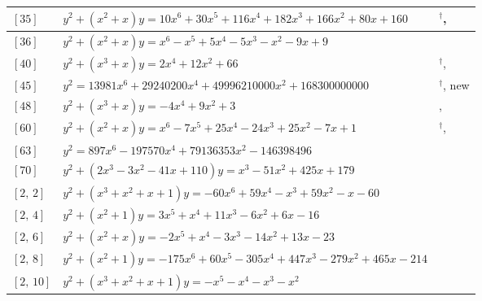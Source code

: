 \documentclass[11pt]{amsart}
\begin{document}
\begin{longtable}{|>{\raggedright\arraybackslash}p{1.7cm}|>{\raggedright\arraybackslash}p{}|>{\raggedright\arraybackslash}p{2.6cm}|}
$[35]$ & \href{https://alpha.lmfdb.org/Genus2Curve/Q/?jump=[[160,80,166,182,116,30,10],[0,1,1]]}{$y^2 + (x^{2}+x)y = 10x^{6}+30x^{5}+116x^{4}+182x^{3}+166x^{2}+80x+160$} & \cite{HLP2000}$^\dagger$, \cite{BookerSutherland}\\ \hline
$[36]$ & \href{https://alpha.lmfdb.org/Genus2Curve/Q/?jump=[[9,-9,-1,-5,5,-1,1],[0,1,1]]}{$y^2 + (x^{2}+x)y = x^{6}-x^{5}+5x^{4}-5x^{3}-x^{2}-9x+9$} & \cite{PP2012b,Platonov2014}\\ \hline
$[40]$ & \href{https://alpha.lmfdb.org/Genus2Curve/Q/?jump=[[66,0,12,0,2],[0,1,0,1]]}{$y^2 + (x^{3}+x)y = 2x^{4}+12x^{2}+66$} & \cite{HLP2000}$^\dagger$, \cite{BookerSutherland}\\ \hline
$[45]$ & $y^2 = 13981x^{6}+29240200x^{4}+49996210000x^{2}+168300000000$ & \cite{HLP2000}$^\dagger$, new\\ \hline
$[48]$ & \href{https://alpha.lmfdb.org/Genus2Curve/Q/?jump=[[3,0,9,0,-4],[0,1,0,1]]}{$y^2 + (x^{3}+x)y = -4x^{4}+9x^{2}+3$} & \cite{PP2012b,Platonov2014}, \cite{Howe2015}\\ \hline
$[60]$ & \href{https://alpha.lmfdb.org/Genus2Curve/Q/?jump=[[1,-7,25,-24,25,-7,1],[0,1,1]]}{$y^2 + (x^{2}+x)y = x^{6}-7x^{5}+25x^{4}-24x^{3}+25x^{2}-7x+1$} & \cite{HLP2000}$^\dagger$, \cite{BookerSutherland}\\ \hline
$[63]$ & $y^2 = 897x^{6}-197570x^{4}+79136353x^{2}-146398496$ & \cite{HLP2000}\\ \hline
$[70]$ & $y^2 + (2x^{3}-3x^{2}-41x+110)y = x^{3}-51x^{2}+425x+179$ & \cite{Howe2015}\\ \hline
$[2,\,2]$ & \href{https://alpha.lmfdb.org/Genus2Curve/Q/?jump=[[-60,-1,59,-1,59,0,-60],[1,1,1,1]]}{$y^2 + (x^{3}+x^{2}+x+1)y = -60x^{6}+59x^{4}-x^{3}+59x^{2}-x-60$} & \cite{BookerSutherland}\\ \hline
$[2,\,4]$ & \href{https://alpha.lmfdb.org/Genus2Curve/Q/?jump=[[-16,6,-6,11,1,3],[1,0,1]]}{$y^2 + (x^{2}+1)y = 3x^{5}+x^{4}+11x^{3}-6x^{2}+6x-16$} & \cite{BookerSutherland}\\ \hline
$[2,\,6]$ & \href{https://alpha.lmfdb.org/Genus2Curve/Q/?jump=[[-23,13,-14,-3,1,-2],[0,1,1]]}{$y^2 + (x^{2}+x)y = -2x^{5}+x^{4}-3x^{3}-14x^{2}+13x-23$} & \cite{BookerSutherland}\\ \hline
$[2,\,8]$ & \href{https://alpha.lmfdb.org/Genus2Curve/Q/?jump=[[-214,465,-279,447,-305,60,-175],[1,0,1]]}{$y^2 + (x^{2}+1)y = -175x^{6}+60x^{5}-305x^{4}+447x^{3}-279x^{2}+465x-214$} & \cite{BookerSutherland}\\ \hline
$[2,\,10]$ & \href{https://www.lmfdb.org/Genus2Curve/Q/256/a/512/1}{$y^2 + (x^{3}+x^{2}+x+1)y = -x^{5}-x^{4}-x^{3}-x^{2}$} & \cite{Ogg1973}\\ \hline

\end{longtable}
\end{document}
